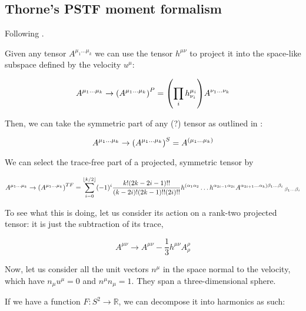 \documentclass[main.tex]{subfiles}
\begin{document}

\subsection{Thorne's PSTF moment formalism}

Following \cite{Thorne:1981feb}.

Given any tensor \(A^{\mu_1 \dots \mu_k}\) we can use the tensor \(h^{\mu\nu}\) to project it into the space-like subspace defined by the velocity \(u^\mu\):

\begin{equation}
    A^{\mu_1 \dots \mu_k} \rightarrow \qty(A^{\mu_1 \dots \mu_k})^P
    = \qty(\prod_i h^{\mu_i}_{\nu_i}) A^{\nu_1 \dots \nu_k}
\end{equation}

Then, we can take the symmetric part of any (?) tensor as outlined in :

\begin{equation}
    A^{\mu_1 \dots \mu_k} \rightarrow \qty(A^{\mu_1 \dots \mu_k})^S
    = A^{(\mu_1 \dots \mu_k)}
\end{equation}

We can select the trace-free part of a projected, symmetric tensor by

\begin{equation}
    A^{\mu_1 \dots \mu_k} \rightarrow \qty(A^{\mu_1 \dots \mu_k})^{TF}
    = \sum _{i=0}   ^{\lfloor k/2 \rfloor}
    (-1)^i \frac{k! (2k-2i-1)!!}{(k-2i)! (2k-1)!! (2i)!!}
    h^{(\alpha_1 \alpha_2} \dots h^{\alpha_{2i-1} \alpha_{2i}}
    A^{\alpha_{2i+1} \dots \alpha_k) \beta_1 \dots \beta_i}\,_{\beta_1 \dots \beta_i}
\end{equation}

To see what this is doing, let us consider its action on a rank-two projected tensor: it is just the subtraction of its trace,

\begin{equation}
    A^{\mu\nu} \rightarrow A^{\mu\nu} - \frac{1}{3} h^{\mu\nu} A^{\rho}_\rho
\end{equation}

Now, let us consider all the unit vectors \(n^\mu\) in the space normal to the velocity, which have \(n_\mu u^\mu = 0\) and \(n^\mu n_\mu = 1\). They span a three-dimensional sphere.

If we have a function \(F\colon S^2 \rightarrow \mathbb R\), we can decompose it into harmonics as such:
\end{document}
